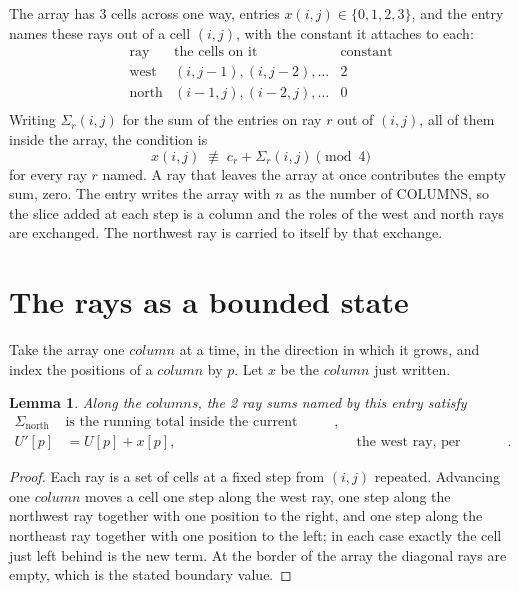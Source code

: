 \documentclass[11pt,a4paper]{article}
\theoremstyle{plain}
\newtheorem{lemma}[theorem]{Lemma}
\theoremstyle{definition}
\begin{document}
The array has $3$ cells across one way, entries $x(i,j)\in\{0,1,2,3\}$, and the entry names these
rays out of a cell $(i,j)$, with the constant it attaches to each:
\[
\begin{array}{lll}
\text{ray} & \text{the cells on it} & \text{constant} \\[2pt]
\text{west} & (i,j-1),(i,j-2),\dots & 2 \\
\text{north} & (i-1,j),(i-2,j),\dots & 0 \\
\end{array}
\]
Writing $\Sigma_r(i,j)$ for the sum of the entries on ray $r$ out of $(i,j)$, all of them
inside the array, the condition is
\[
x(i,j)\;\not\equiv\;c_r+\Sigma_r(i,j) \pmod{4}
\]
for every ray $r$ named. A ray that leaves the array at once contributes the empty sum,
zero. The entry writes the array with $n$ as the number of COLUMNS, so the slice added at each step is a column and the roles of the west and north rays are exchanged. The northwest ray is carried to itself by that exchange.

\section{The rays as a bounded state}

Take the array one $column$ at a time, in the direction in which it grows, and index the
positions of a $column $ by $p$. Let $x$ be the $column$ just written.

\begin{lemma}\label{lem:rays}
Along the $column$s, the 2 ray sums named by this entry satisfy
\[
\begin{aligned}
\Sigma_{\mathrm{north}}\ &\text{is the running total inside the current column},\\
U'[p]&=U[p]+x[p], &&\text{the west ray, per position} .
\end{aligned}
\]
\end{lemma}

\begin{proof}
Each ray is a set of cells at a fixed step from $(i,j)$ repeated. Advancing one $column$
moves a cell one step along the west ray, one step along the northwest ray together with one
position to the right, and one step along the northeast ray together with one position to the
left; in each case exactly the cell just left behind is the new term. At the border of the
array the diagonal rays are empty, which is the stated boundary value.
\end{proof}
\end{document}
